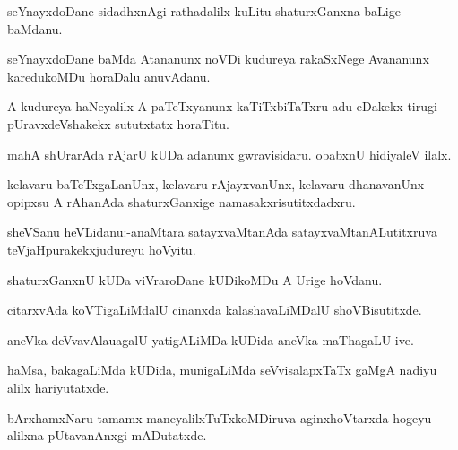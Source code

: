 \documentclass{article}
\begin{document}
\begin{mn}%
seYnayxdoDane sidadhxnAgi rathadalilx kuLitu shaturxGanxna baLige baMdanu.
\end{mn}

\begin{mn}%
seYnayxdoDane baMda Atananunx noVDi kudureya rakaSxNege Avananunx karedukoMDu horaDalu 
anuvAdanu.
\end{mn}

\begin{mn}%
A kudureya haNeyalilx A paTeTxyanunx kaTiTxbiTaTxru adu eDakekx tirugi pUravxdeVshakekx 
sututxtatx horaTitu.
\end{mn}

\begin{mn}%
mahA shUrarAda rAjarU kUDa adanunx gwravisidaru. obabxnU hidiyaleV ilalx.
\end{mn}

\begin{mn}%
kelavaru baTeTxgaLanUnx, kelavaru rAjayxvanUnx, kelavaru dhanavanUnx opipxsu A rAhanAda 
shaturxGanxige namasakxrisutitxdadxru.
\end{mn}



\begin{mn}%
sheVSanu heVLidanu:-anaMtara satayxvaMtanAda satayxvaMtanALutitxruva 
teVjaHpurakekxjudureyu hoVyitu.
\end{mn}

\begin{mn}%
shaturxGanxnU kUDa viVraroDane kUDikoMDu A Urige hoVdanu.
\end{mn}

\begin{mn}%
citarxvAda koVTigaLiMdalU cinanxda kalashavaLiMDalU shoVBisutitxde.
\end{mn}

\begin{mn}%
aneVka deVvavAlauagalU yatigALiMDa kUDida aneVka maThagaLU ive.
\end{mn}

\begin{mn}%
haMsa, bakagaLiMda kUDida, munigaLiMda seVvisalapxTaTx gaMgA nadiyu alilx hariyutatxde.
\end{mn}

\begin{mn}%
bArxhamxNaru tamamx maneyalilxTuTxkoMDiruva aginxhoVtarxda hogeyu alilxna pUtavanAnxgi 
mADutatxde.
\end{mn}
\end{document}
